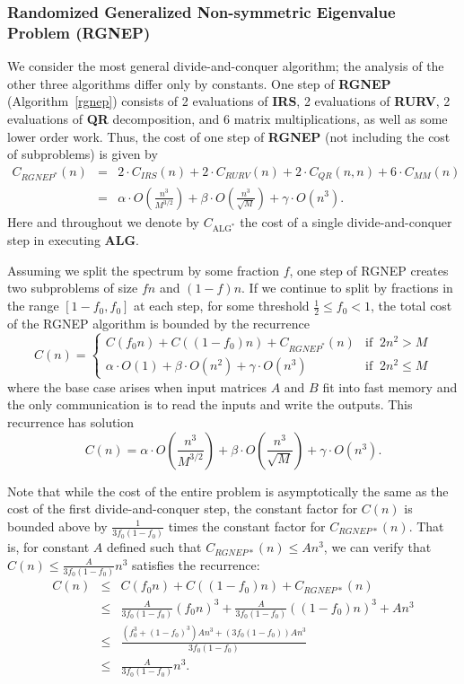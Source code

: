 \documentclass{article}
\def\lt{\left}
\def\rt{\right}
\theoremstyle{definition}
\begin{document}
 \subsubsection{Randomized Generalized Non-symmetric Eigenvalue Problem (\textbf{RGNEP})}

We consider the most general divide-and-conquer algorithm; the analysis of the other three algorithms differ only by constants.  One step of \textbf{RGNEP} (Algorithm~\ref{rgnep}) consists of 2 evaluations of \textbf{IRS}, 2 evaluations of \textbf{RURV}, 2 evaluations of \textbf{QR} decomposition, and 6 matrix multiplications, as well as some lower order work.  Thus, the cost of one step of \textbf{RGNEP} (not including the cost of subproblems) is given by
 \begin{eqnarray*}
C_{RGNEP^*}(n) &=& 2 \cdot C_{IRS}(n) + 2 \cdot C_{RURV}(n) + 2 \cdot C_{QR}(n,n) + 6 \cdot C_{MM}(n) \\
&=& \alpha \cdot O \lt(\frac{n^3}{M^{3/2}}\rt) + \beta \cdot O \lt(\frac{n^3}{\sqrt M}\rt) + \gamma \cdot O \lt(n^3\rt).
\end{eqnarray*}
Here and throughout we denote by $C_{\text{ALG}^*}$ the cost of a single divide-and-conquer step in executing \textbf{ALG}.

Assuming we split the spectrum by some fraction $f$, one step of RGNEP creates two subproblems of size $fn$ and $(1-f)n$. 
If we continue to split by fractions in the range $[1-f_0,f_0]$ at each step, for some threshold $\frac12\leq f_0<1$, the total cost of the RGNEP algorithm is bounded by the recurrence $$C(n) = \left\{ \begin{array}{lr}
C\lt(f_0n\rt) + C\lt((1-f_0)n\rt) + C_{RGNEP^*}(n) & \text{if}\;\; 2n^2 > M  \\
\alpha \cdot O (1) + \beta \cdot O (n^2) + \gamma \cdot O \lt(n^3\rt) & \text{if}\;\; 2n^2 \leq M
\end{array} \right.$$
where the base case arises when input matrices $A$ and $B$ fit into fast memory and the only communication is to read the inputs and write the outputs.  This recurrence has solution
$$ C(n) = \alpha \cdot O \lt(\frac{n^3}{M^{3/2}}\rt) + \beta \cdot O \lt(\frac{n^3}{\sqrt M}\rt) + \gamma \cdot O \lt(n^3\rt). $$

Note that while the cost of the entire problem is asymptotically the same as the cost of the first divide-and-conquer step, the constant factor for $C(n)$ is bounded above by $\frac{1}{3f_0(1-f_0)}$ times the constant factor for $C_{RGNEP*}(n)$.  That is, for constant $A$ defined such that $C_{RGNEP*}(n)\leq An^3$, we can verify that $C(n)\leq \frac{A}{3f_0(1-f_0)} n^3$ satisfies the recurrence:
\begin{eqnarray*}
C(n) &\leq& C(f_0n)+C((1-f_0)n)+C_{RGNEP*}(n) \\
&\leq& \frac{A}{3f_0(1-f_0)} (f_0n)^3 + \frac{A}{3f_0(1-f_0)} ((1-f_0)n)^3 + An^3 \\
&\leq& \frac{(f_0^3+(1-f_0)^3)An^3+(3f_0(1-f_0))An^3}{3f_0(1-f_0)} \\
&\leq& \frac{A}{3f_0(1-f_0)}n^3.
\end{eqnarray*}
\end{document}
